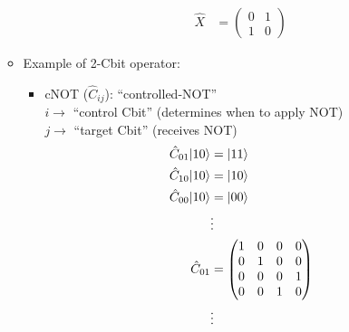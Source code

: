 \documentclass{../doc}
\begin{document}
\begin{itemize}
\begin{itemize}
\begin{itemize}
\begin{align}
                  \hat X &= \begin{pmatrix}
                    0 & 1 \\
                    1 & 0
                  \end{pmatrix}
                \end{align}
            \end{itemize}
          \item Example of 2-Cbit operator:
            \begin{itemize}
              \item cNOT ($\hat C_{ij}$): ``controlled-NOT'' \\
                $i \to$ ``control Cbit'' (determines when to apply NOT) \\
                $j \to$ ``target Cbit'' (receives NOT)
                \begin{align}
                  \hat C_{01} | 10 \rangle &= | 11 \rangle \\
                  \hat C_{10} | 10 \rangle &= | 10 \rangle \\
                  \hat C_{00} | 10 \rangle &= | 00 \rangle \\
                  &\vdots \notag\\
                  \hat C_{01} &= \begin{pmatrix}
                    1 & 0 & 0 & 0 \\
                    0 & 1 & 0 & 0 \\
                    0 & 0 & 0 & 1 \\
                    0 & 0 & 1 & 0
                  \end{pmatrix} \\
                  &\vdots \notag
                \end{align}
              

\end{itemize}
\end{itemize}
\end{itemize}
\end{document}

